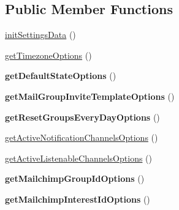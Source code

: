 \subsection*{Public Member Functions}
\begin{DoxyCompactItemize}
\item 
\hyperlink{classDMA_1_1Friends_1_1Models_1_1Settings_a182b5e2b83cfc057c1cd31499ad9e244}{init\+Settings\+Data} ()
\item 
\hyperlink{classDMA_1_1Friends_1_1Models_1_1Settings_a347eae65e8aeb114767d5e4fc8542fea}{get\+Timezone\+Options} ()
\item 
\hypertarget{classDMA_1_1Friends_1_1Models_1_1Settings_a89a0d979d3ba9338c0ce304255a56bbb}{}{\bfseries get\+Default\+State\+Options} ()\label{classDMA_1_1Friends_1_1Models_1_1Settings_a89a0d979d3ba9338c0ce304255a56bbb}

\item 
\hypertarget{classDMA_1_1Friends_1_1Models_1_1Settings_aafef2e58559c6053550fe133b900246b}{}{\bfseries get\+Mail\+Group\+Invite\+Template\+Options} ()\label{classDMA_1_1Friends_1_1Models_1_1Settings_aafef2e58559c6053550fe133b900246b}

\item 
\hypertarget{classDMA_1_1Friends_1_1Models_1_1Settings_ac88752cae719c48bde66c9cb2f945952}{}{\bfseries get\+Reset\+Groups\+Every\+Day\+Options} ()\label{classDMA_1_1Friends_1_1Models_1_1Settings_ac88752cae719c48bde66c9cb2f945952}

\item 
\hyperlink{classDMA_1_1Friends_1_1Models_1_1Settings_a8c2bad0fb18f5e501d3318eba7379609}{get\+Active\+Notification\+Channels\+Options} ()
\item 
\hyperlink{classDMA_1_1Friends_1_1Models_1_1Settings_a140721a33440c666426139d6317bd357}{get\+Active\+Listenable\+Channels\+Options} ()
\item 
\hypertarget{classDMA_1_1Friends_1_1Models_1_1Settings_a9dbe7556eddf92bbf3c05dbd54cc5047}{}{\bfseries get\+Mailchimp\+Group\+Id\+Options} ()\label{classDMA_1_1Friends_1_1Models_1_1Settings_a9dbe7556eddf92bbf3c05dbd54cc5047}

\item 
\hypertarget{classDMA_1_1Friends_1_1Models_1_1Settings_ae606222dcac19623a6ba656ccab5568d}{}{\bfseries get\+Mailchimp\+Interest\+Id\+Options} ()\label{classDMA_1_1Friends_1_1Models_1_1Settings_ae606222dcac19623a6ba656ccab5568d}

\end{DoxyCompactItemize}
